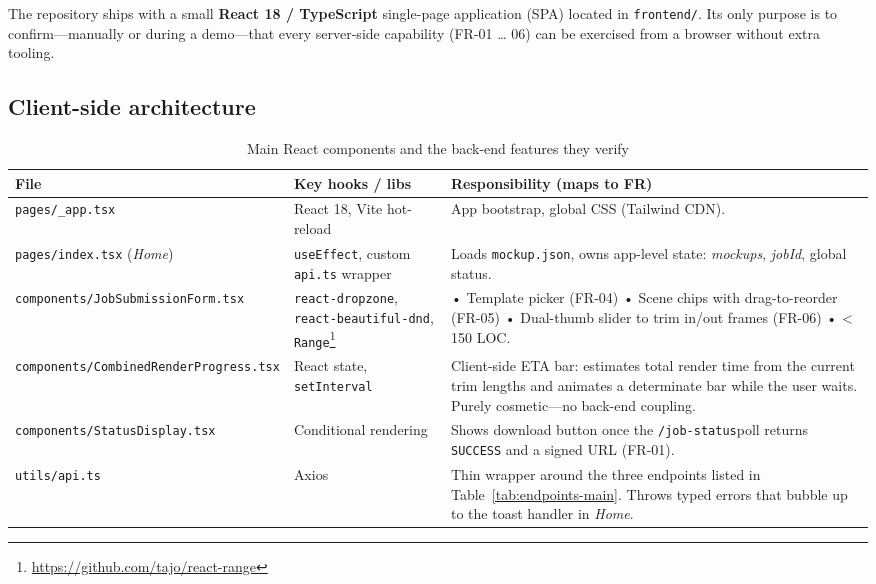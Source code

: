 The repository ships with a small \textbf{React 18 / TypeScript} single-page
application (SPA) located in \texttt{frontend/}.  
Its only purpose is to confirm—manually or during a demo—that every
server-side capability (FR-01 … 06) can be exercised from a browser without
extra tooling.

\subsection{Client-side architecture}

\begin{table}[htbp]
  \caption{Main React components and the back-end features they verify}
  \label{tab:fe-components}
  \scriptsize\centering
  \begin{tabularx}{\textwidth}{@{}l l X@{}}
    \toprule
    \textbf{File} & \textbf{Key hooks / libs} & \textbf{Responsibility (maps to FR)} \\
    \midrule
    \texttt{pages/\_app.tsx} &
      React 18, Vite hot-reload &
      App bootstrap, global CSS (Tailwind CDN). \\[0.35em]

    \texttt{pages/index.tsx} (\textit{Home}) &
      \texttt{useEffect}, custom \texttt{api.ts} wrapper &
      Loads \texttt{mockup.json}, owns app-level state:
      \textit{mockups}, \textit{jobId}, global status. \\[0.35em]

    \texttt{components/JobSubmissionForm.tsx} &
      \texttt{react-dropzone}, \texttt{react-beautiful-dnd},
      \texttt{Range}\footnote{\url{https://github.com/tajo/react-range}} &
      • Template picker (FR-04)\newline
      • Scene chips with drag-to-reorder (FR-05)\newline
      • Dual-thumb slider to trim in/out frames (FR-06)\newline
      • < 150 LOC. \\[0.55em]

    \texttt{components/CombinedRenderProgress.tsx} &
      React state, \texttt{setInterval} &
      Client-side ETA bar: estimates total render time from the
      current trim lengths and animates a determinate bar while the
      user waits.  Purely cosmetic—no back-end coupling. \\[0.55em]

    \texttt{components/StatusDisplay.tsx} &
      Conditional rendering &
      Shows download button once the
      \texttt{/job-status}poll returns \texttt{SUCCESS} and a signed
      URL (FR-01). \\[0.35em]

    \texttt{utils/api.ts} &
      Axios &
      Thin wrapper around the three endpoints listed in
      Table~\ref{tab:endpoints-main}.  Throws typed errors that bubble
      up to the toast handler in \textit{Home}. \\
    \bottomrule
  \end{tabularx}
\end{table}

